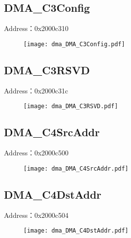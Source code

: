 \subsection{DMA\_C3Config}
\label{dma-DMA-C3Config}
Address：0x2000c310
 \begin{figure}[H]
\texttt{[image: dma\_DMA\_C3Config.pdf]}
\end{figure}

\subsection{DMA\_C3RSVD}
\label{dma-DMA-C3RSVD}
Address：0x2000c31c
 \begin{figure}[H]
\texttt{[image: dma\_DMA\_C3RSVD.pdf]}
\end{figure}

\subsection{DMA\_C4SrcAddr}
\label{dma-DMA-C4SrcAddr}
Address：0x2000c500
 \begin{figure}[H]
\texttt{[image: dma\_DMA\_C4SrcAddr.pdf]}
\end{figure}

\subsection{DMA\_C4DstAddr}
\label{dma-DMA-C4DstAddr}
Address：0x2000c504
 \begin{figure}[H]
\texttt{[image: dma\_DMA\_C4DstAddr.pdf]}
\end{figure}

